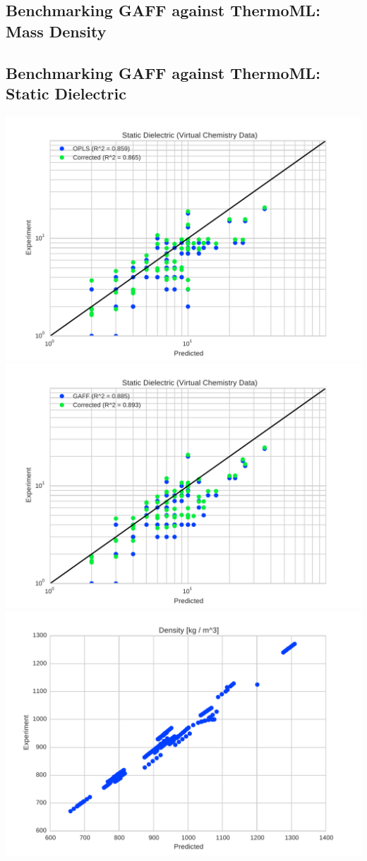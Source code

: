 \documentclass[aps,pre,twocolumn,superscriptaddress]{revtex4-1}
\begin{document}
\subsection{Benchmarking GAFF against ThermoML: Mass Density}


\subsection{Benchmarking GAFF against ThermoML: Static Dielectric}

\includegraphics[width=\columnwidth]{./figures/dielectric_virtual_chemistry_opls.pdf}
\includegraphics[width=\columnwidth]{./figures/dielectric_virtual_chemistry_gaff.pdf}
\includegraphics[width=\columnwidth]{./figures/densities_thermoml.pdf}
\end{document}
